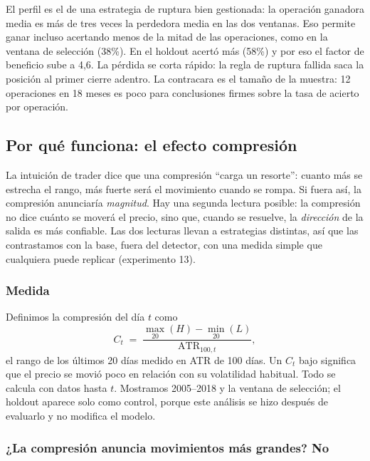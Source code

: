 \documentclass[10pt,a4paper]{article}
\begin{document}
El perfil es el de una estrategia de ruptura bien gestionada: la operación ganadora
media es más de tres veces la perdedora media en las dos ventanas. Eso permite ganar
incluso acertando menos de la mitad de las operaciones, como en la ventana de selección
(38\%). En el holdout acertó más (58\%) y por eso el factor de beneficio sube a 4,6. La
pérdida se corta rápido: la regla de ruptura fallida saca la posición al primer cierre
adentro. La contracara es el tamaño de la muestra: 12 operaciones en 18 meses es poco
para conclusiones firmes sobre la tasa de acierto por operación.

\subsection{Por qué funciona: el efecto compresión}\label{sec:compresion}

La intuición de trader dice que una compresión ``carga un resorte'': cuanto más se
estrecha el rango, más fuerte será el movimiento cuando se rompa. Si fuera así, la
compresión anunciaría \emph{magnitud}. Hay una segunda lectura posible: la compresión no
dice cuánto se moverá el precio, sino que, cuando se resuelve, la \emph{dirección} de la
salida es más confiable. Las dos lecturas llevan a estrategias distintas, así que las
contrastamos con la base, fuera del detector, con una medida simple que cualquiera puede
replicar (experimento 13).

\subsubsection{Medida}

Definimos la compresión del día $t$ como
\begin{equation}
  C_t \;=\; \frac{\max_{20}(H) - \min_{20}(L)}{\text{ATR}_{100,t}},
\end{equation}
el rango de los últimos 20 días medido en ATR de 100 días. Un $C_t$ bajo significa que
el precio se movió poco en relación con su volatilidad habitual. Todo se calcula con
datos hasta $t$. Mostramos 2005--2018 y la ventana de selección; el holdout aparece solo
como control, porque este análisis se hizo después de evaluarlo y no modifica el modelo.

\subsubsection{¿La compresión anuncia movimientos más grandes? No}
\end{document}
